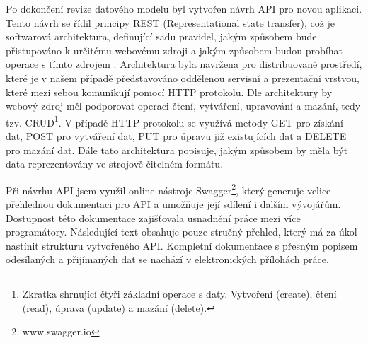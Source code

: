 \documentclass[
  digital, %
  twoside, %
  table,   %
  lof,     %
  lot,     %
]{fithesis3}
\begin{document}
Po dokončení revize datového modelu byl vytvořen návrh API pro novou aplikaci. Tento návrh se řídil principy REST (Representational state transfer), což je softwarová architektura, definující sadu pravidel, jakým způsobem bude přistupováno k určitému webovému zdroji a jakým způsobem budou probíhat operace s tímto zdrojem \cite{RoyThomasFielding2000ArchitecturalArchitectures}. Architektura byla navržena pro distribuované prostředí, které je v našem případě představováno oddělenou servisní a prezentační vrstvou, které mezi sebou komunikují pomocí HTTP protokolu. Dle architektury by webový zdroj měl podporovat operaci čtení, vytváření, upravování a mazání, tedy tzv. CRUD\footnote{Zkratka shrnující čtyři základní operace s daty. Vytvoření (create), čtení (read), úprava (update) a mazání (delete).}. V případě HTTP protokolu se využívá metody GET pro získání dat, POST pro vytváření dat, PUT pro úpravu již existujících dat a DELETE pro mazání dat. Dále tato architektura popisuje, jakým způsobem by měla být data reprezentovány ve strojově čitelném formátu. \cite{RoyThomasFielding2000ArchitecturalArchitectures}

Při návrhu API jsem využil online nástroje Swagger\footnote{www.swagger.io}, který generuje velice přehlednou dokumentaci pro API a umožňuje její sdílení i dalším vývojářům. Dostupnost této dokumentace zajišťovala usnadnění práce mezi více programátory. Následující text obsahuje pouze stručný přehled, který má za úkol nastínit strukturu vytvořeného API. Kompletní dokumentace s přesným popisem odesílaných a přijímaných dat se nachází v elektronických přílohách práce.
\end{document}
